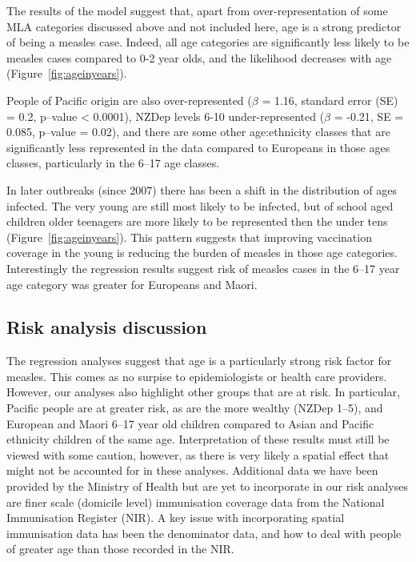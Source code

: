 \documentclass{article}
\begin{document}
The results of the model suggest that, apart from over-representation of some MLA categories discussed above and not included here, age is a strong predictor of being a measles case. Indeed, all age categories are significantly less likely to be measles cases compared to 0-2 year olds, and the likelihood decreases with age (Figure~\ref{fig:ageinyears}).

People of Pacific origin are also over-represented ($\beta$ = 1.16, standard error (SE) = 0.2, p--value < 0.0001), NZDep levels 6-10 under-represented ($\beta$ = -0.21, SE = 0.085, p--value = 0.02), and there are some other age:ethnicity classes that are significantly less represented in the data compared to Europeans in those ages classes, particularly in the 6--17 age classes.

In later outbreaks (since 2007) there has been a shift in the distribution of ages infected. The very young are still most likely to be infected, but of school aged children older teenagers are more likely to be represented then the under tens (Figure~\ref{fig:ageinyears}). This pattern suggests that improving vaccination coverage in the young is reducing the burden of measles in those age categories. Interestingly the regression results suggest risk of measles cases in the 6--17 year age category was greater for Europeans and Maori.

\subsection{Risk analysis discussion}

The regression analyses suggest that age is a particularly strong risk factor for measles. This comes as no surpise to epidemiologists or health care providers. However, our analyses also highlight other groups that are at risk. In particular, Pacific people are at greater risk, as are the more wealthy (NZDep 1--5), and European and Maori 6--17 year old children compared to Asian and Pacific ethnicity children of the same age. Interpretation of these results must still be viewed with some caution, however, as there is very likely a spatial effect that might not be accounted for in these analyses. Additional data we have been provided by the Ministry of Health but are yet to incorporate in our risk analyses are finer scale (domicile level) immunisation coverage data from the National Immunisation Register (NIR). A key issue with incorporating spatial immunisation data has been the denominator data, and how to deal with people of greater age than those recorded in the NIR.
\end{document}
